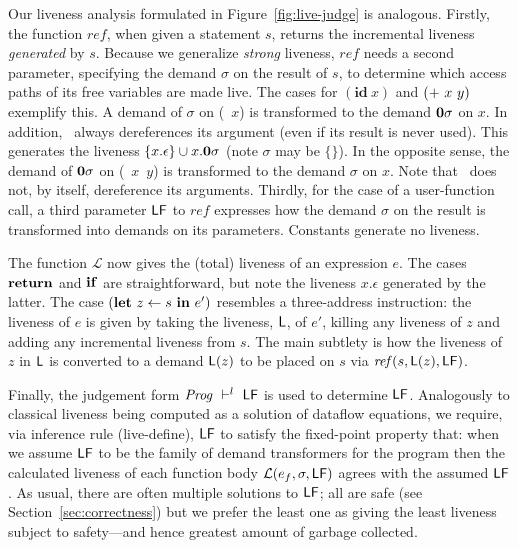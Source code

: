 \documentclass[10pt]{sigplanconf}
\newcommand{\ID}{\mbox{$\mathbf{ id}$}} %
\begin{document}
Our  liveness analysis  formulated  in Figure~\ref{fig:live-judge}  is
analogous.
Firstly,  the function  $\mathit{ref}$,  when given  a statement  $s$,
returns the  incremental liveness {\em generated} by  $s$.  Because we
generalize  {\em  strong}  liveness,  $\mathit{ref}$  needs  a  second
parameter, specifying  the demand  $\sigma$ on the  result of  $s$, to
determine which access paths of its free variables are made live.  The
cases for $(\ID\ x)$ and $(\mbox{$\mathbf{ +}$}\ x\ y)$ exemplify this.
A demand  of  $\sigma$  on  (\CAR~$x$)  is  transformed  to  the  demand
$\mathbf{0}\sigma$  on  $x$.   In  addition, \CAR\  always  dereferences  its
argument (even if its result is never used).
This generates the liveness  $\{x.\epsilon\} \cup  x.\mathbf{0}\sigma$
(note $\sigma$ may be $\{\}$).
In the opposite  sense, the  demand  of $\mathbf{0}\sigma$  on
(\CONS~$x$~$y$) is  transformed to the  demand $\sigma$ on  $x$.  Note
that \CONS\ does not, by itself, dereference its arguments.
Thirdly, for the case of a user-function call, a third parameter $\mathsf{LF}$ to 
$\mathit{ref}$
expresses how the demand $\sigma$ on the result is transformed into demands on its parameters.
Constants generate no liveness.

The  function  $\mathcal{L}$ now  gives  the  (total)  liveness of  an
expression $e$.   The cases $\mbox{$\mathbf{ return}$}$ and  $\mbox{$\mathbf{ if}$}$ are straightforward,
but note the liveness $x.\epsilon$  generated by the latter.  The case
$(\mbox{$\mathbf{ let}$}\   z\leftarrow   s\  \mbox{$\mathbf{ in}$}\   e')$   resembles  a   three-address
instruction:  the liveness  of $e$  is given  by taking  the liveness,
$\mathsf{L}$, of $e'$, killing any liveness of $z$ and adding any incremental
liveness from  $s$.  The main subtlety  is how the liveness  of $z$ in
$\mathsf{L}$  is converted  to a  demand  $\mathsf{L}(z)$ to  be placed  on $s$  via
$\mathit{ref}(s,\mathsf{L}(z),\mathsf{LF})$.

Finally, the  judgement form $\mathit{Prog}  \ \vdash^l\  \mathsf{LF}$ is  used to
determine  $\mathsf{LF}$\@.   Analogously   to  classical  liveness  being
computed  as  a  solution  of  dataflow  equations,  we  require,  via
inference   rule  ({\sc  live-define}),   $\mathsf{LF}$  to   satisfy  the
fixed-point property that:  when we assume $\mathsf{LF}$ to  be the family
of demand transformers for the program then the calculated liveness of
each function  body $\mathcal{L}(e_f,\sigma,\mathsf{LF})$ agrees  with the
assumed $\mathsf{LF}$.   As usual, there  are often multiple  solutions to
$\mathsf{LF}$;  all are  safe (see  Section~\ref{sec:correctness})  but we
prefer  the  least  one  as  giving  the  least  liveness  subject  to
safety---and hence greatest amount of garbage collected.
\end{document}
